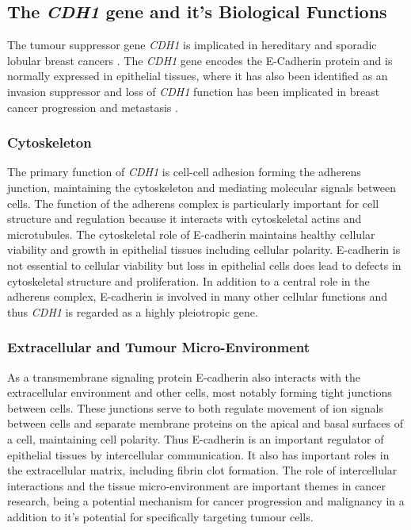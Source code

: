 \subsection{The \textit{CDH1} gene and it's Biological Functions}
The tumour suppressor gene \textit{CDH1} is implicated in hereditary and sporadic lobular breast cancers \cite{Berx1996,DeLeeuw1997,Berx2009,Vos1997,Semb1998,Masciari2007}. The \textit{CDH1} gene encodes the E-Cadherin protein and is normally expressed in epithelial tissues, where it has also been identified as an invasion suppressor and loss of \textit{CDH1} function has been implicated in breast cancer progression and metastasis \cite{Berx1995,Becker1994,Christofori1999}.

\subsubsection{Cytoskeleton}
The primary function of \textit{CDH1} is cell-cell adhesion forming the adherens junction, maintaining the cytoskeleton and mediating molecular signals between cells. The function of the adherens complex is particularly important for cell structure and regulation because it interacts with cytoskeletal actins and microtubules. The cytoskeletal role of E-cadherin maintains healthy cellular viability and growth in epithelial tissues including cellular polarity. E-cadherin is not essential to cellular viability but loss in epithelial cells does lead to defects in cytoskeletal structure and proliferation. In addition to a central role in the adherens complex, E-cadherin is involved in many other cellular functions and thus \textit{CDH1} is regarded as a highly pleiotropic gene.

\subsubsection{Extracellular and Tumour Micro-Environment}
As a transmembrane signaling protein E-cadherin also interacts with the extracellular environment and other cells, most notably forming tight junctions between cells. These junctions serve to both regulate movement of ion signals between cells and separate membrane proteins on the apical and basal surfaces of a cell, maintaining cell polarity. Thus E-cadherin is an important regulator of epithelial tissues by intercellular communication. It also has important roles in the extracellular matrix, including fibrin clot formation. The role of intercellular interactions and the tissue micro-environment are important themes in cancer research, being a potential mechanism for cancer progression and malignancy in a addition to it's potential for specifically targeting tumour cells.

